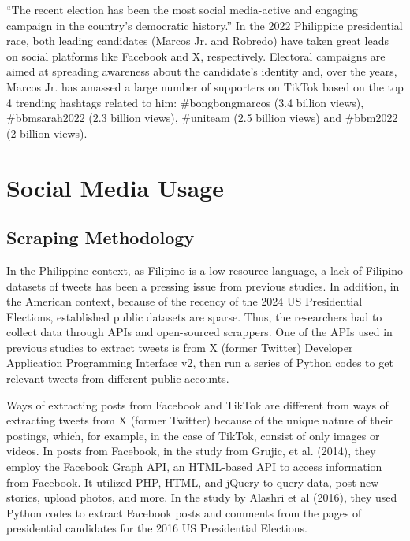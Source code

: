 “The recent election has been the most social media-active and engaging campaign in the country’s democratic history.” In the 2022 Philippine presidential race, both leading candidates (Marcos Jr. and Robredo) have taken great leads on social platforms like Facebook and X, respectively.\cite{RRL_Ampon-2023} Electoral campaigns are aimed at spreading awareness about the candidate’s identity and, over the years, Marcos Jr. has amassed a large number of supporters on TikTok based on the top 4 trending hashtags related to him: \#bongbongmarcos (3.4 billion views), \#bbmsarah2022 (2.3 billion views), \#uniteam (2.5 billion views) and \#bbm2022 (2 billion views).\cite{RRL_Mendoza-2022}

\section{Social Media Usage}

\subsection{Scraping Methodology}
In the Philippine context, as Filipino is a low-resource language, a lack of Filipino datasets of tweets has been a pressing issue from previous studies. In addition, in the American context, because of the recency of the 2024 US Presidential Elections, established public datasets are sparse. Thus, the researchers had to collect data through APIs and open-sourced scrappers. One of the APIs used in previous studies to extract tweets is from X (former Twitter) Developer Application Programming Interface v2, then run a series of Python codes to get relevant tweets from different public accounts.\cite{RRL_Aquino-2025,RRL_Ancheta-2020}

Ways of extracting posts from Facebook and TikTok are different from ways of extracting tweets from X (former Twitter) because of the unique nature of their postings, which, for example, in the case of TikTok, consist of only images or videos. In posts from Facebook, in the study from Grujic, et al. (2014), they employ the Facebook Graph API, an HTML-based API to access information from Facebook.\cite{RRL_Grujic-2014} It utilized PHP, HTML, and jQuery to query data, post new stories, upload photos, and more. In the study by Alashri et al (2016), they used Python codes to extract Facebook posts and comments from the pages of presidential candidates for the 2016 US Presidential Elections.\cite{RRL_Alashri-2016}

